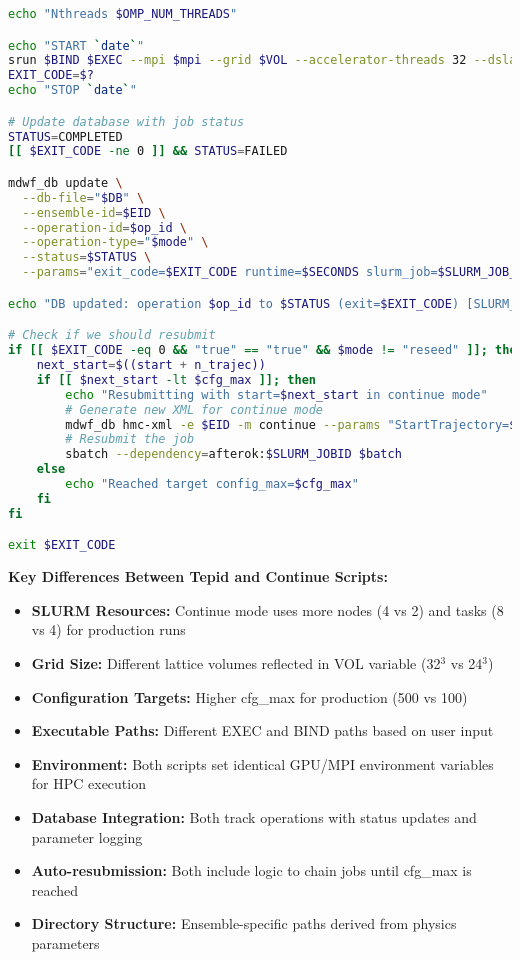 \documentclass{article}
\begin{document}
\begin{lstlisting}[language=bash]
echo "Nthreads $OMP_NUM_THREADS"

echo "START `date`"
srun $BIND $EXEC --mpi $mpi --grid $VOL --accelerator-threads 32 --dslash-unroll --shm 2048 --comms-overlap -shm-mpi 0 > ../log_hmc/log_b2.13_b1.0Ls16_mc0.04_ms0.04_ml0.005_L32_T64.$start
EXIT_CODE=$?
echo "STOP `date`"

# Update database with job status
STATUS=COMPLETED
[[ $EXIT_CODE -ne 0 ]] && STATUS=FAILED

mdwf_db update \
  --db-file="$DB" \
  --ensemble-id=$EID \
  --operation-id=$op_id \
  --operation-type="$mode" \
  --status=$STATUS \
  --params="exit_code=$EXIT_CODE runtime=$SECONDS slurm_job=$SLURM_JOB_ID host=$(hostname)"

echo "DB updated: operation $op_id to $STATUS (exit=$EXIT_CODE) [SLURM_JOB_ID=$SLURM_JOB_ID]"

# Check if we should resubmit
if [[ $EXIT_CODE -eq 0 && "true" == "true" && $mode != "reseed" ]]; then
    next_start=$((start + n_trajec))
    if [[ $next_start -lt $cfg_max ]]; then
        echo "Resubmitting with start=$next_start in continue mode"
        # Generate new XML for continue mode
        mdwf_db hmc-xml -e $EID -m continue --params "StartTrajectory=$next_start Trajectories=$n_trajec"
        # Resubmit the job
        sbatch --dependency=afterok:$SLURM_JOBID $batch
    else
        echo "Reached target config_max=$cfg_max"
    fi
fi

exit $EXIT_CODE
\end{lstlisting}

\textbf{Key Differences Between Tepid and Continue Scripts:}

\begin{itemize}
\item \textbf{SLURM Resources:} Continue mode uses more nodes (4 vs 2) and tasks (8 vs 4) for production runs
\item \textbf{Grid Size:} Different lattice volumes reflected in VOL variable (32$^3$ vs 24$^3$)
\item \textbf{Configuration Targets:} Higher cfg\_max for production (500 vs 100)
\item \textbf{Executable Paths:} Different EXEC and BIND paths based on user input
\item \textbf{Environment:} Both scripts set identical GPU/MPI environment variables for HPC execution
\item \textbf{Database Integration:} Both track operations with status updates and parameter logging
\item \textbf{Auto-resubmission:} Both include logic to chain jobs until cfg\_max is reached
\item \textbf{Directory Structure:} Ensemble-specific paths derived from physics parameters
\end{itemize}
\end{document}
